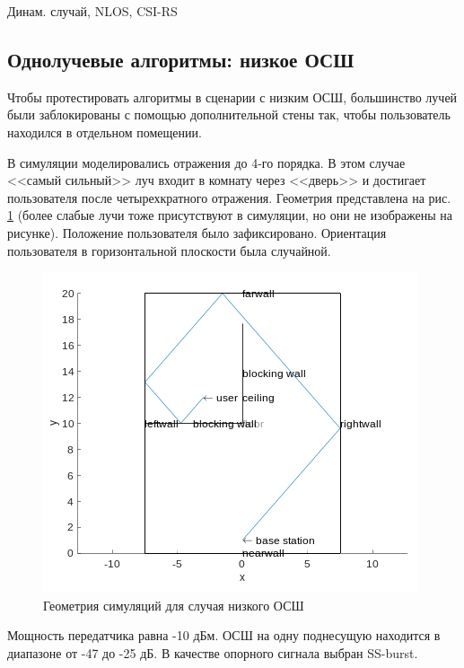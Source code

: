\begin{table}[h!]
  \begin{center}
    \caption{Динам. случай, NLOS, CSI-RS}
    \small
    \label{tab:singlepath:rotation:NLOS-2}
  \end{center}
\end{table}

\subsection{Однолучевые алгоритмы: низкое ОСШ}
\label{sec:singlepath:static:LOW-SNR}
Чтобы протестировать алгоритмы в сценарии с низким ОСШ, 
большинство лучей были заблокированы с помощью дополнительной стены так, чтобы
пользователь находился в отдельном помещении. 

В симуляции моделировались отражения до 4-го порядка.
В этом случае <<самый сильный>> луч входит в комнату
через <<дверь>> и достигает пользователя после четырехкратного отражения. Геометрия
представлена на рис. \ref{fig:4.36} (более слабые лучи тоже присутствуют в
симуляции, но они не изображены на рисунке).
Положение пользователя было зафиксировано. Ориентация пользователя в горизонтальной плоскости была
случайной.

\begin{figure}[ht]
  \centering
  \includegraphics[width=.5\linewidth]{figs/fig4.36}
  \caption{Геометрия симуляций для случая низкого ОСШ}
  \label{fig:4.36}
\end{figure}

Мощность передатчика равна -10 дБм. ОСШ на одну поднесущую находится в диапазоне
от -47 до -25 дБ. В качестве опорного сигнала выбран SS-burst. 

